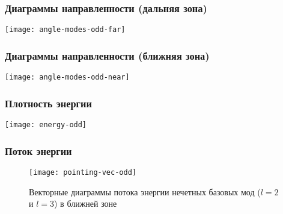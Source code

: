\documentclass[compress]{beamer}
\begin{document}

    \begin{frame}\frametitle{Диаграммы направленности (дальняя зона)}

        \centering\texttt{[image: angle-modes-odd-far]}

    \end{frame}


    \begin{frame}\frametitle{Диаграммы направленности (ближняя зона)}

        \centering\texttt{[image: angle-modes-odd-near]}

    \end{frame}


    \begin{frame}\frametitle{Плотность энергии}

        \centering\texttt{[image: energy-odd]}

    \end{frame}


    \begin{frame}\frametitle{Поток энергии}

        \begin{figure}[!htb]%
            \centering\texttt{[image: pointing-vec-odd]}%
            \captionsetup{labelformat=empty}
            \caption[]{Векторные диаграммы потока энергии нечетных базовых мод ($l=2$ и $l=3$) в ближней зоне}
        \end{figure}

    \end{frame}
\end{document}
